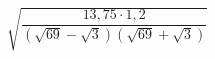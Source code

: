 \begin{ex}[type=calculate]
	\begin{condition}
		\( \sqrt{\dfrac{13,75\cdot1,2}{(\sqrt{69}-\sqrt{3})(\sqrt{69}+\sqrt{3})}} \)
	\end{condition}
\end{ex}